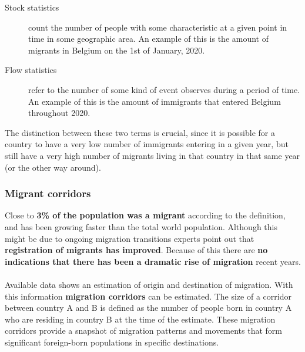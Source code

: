\documentclass[../summary.tex]{subfiles}
\begin{document}
	\begin{description}
		\item[Stock statistics] count the number of people with some characteristic at a given point in time in some geographic area. An example of this is the amount of migrants in Belgium on the 1st of January, 2020.
		\item[Flow statistics] refer to the number of some kind of event observes during a period of time. An example of this is the amount of immigrants that entered Belgium throughout 2020.
	\end{description}
	The distinction between these two terms is crucial, since it is possible for a country to have a very low number of immigrants entering in a given year, but still have a very high number of migrants living in that country in that same year (or the other way around). 
	
	\subsubsection{Migrant corridors}
	Close to \textbf{3\% of the population was a migrant} according to the definition, and has been growing faster than the total world population. Although this might be due to ongoing migration transitions experts point out that \textbf{registration of migrants has improved}. Because of this there are \textbf{no indications that there has been a dramatic rise of migration} recent years.
	\\
	\\
	Available data shows an estimation of origin and destination of migration. With this information \textbf{migration corridors} can be estimated. The size of a corridor between country A and B is defined as the number of people born in country A who are residing in country B at the time of the estimate. These migration corridors provide a snapshot of migration patterns and movements that form significant foreign-born populations in specific destinations.
	
\end{document}
